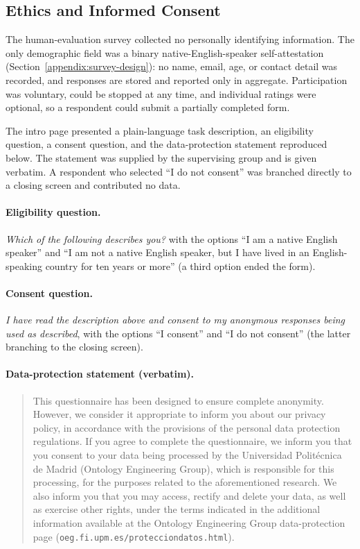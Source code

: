 \subsection{Ethics and Informed Consent}
\label{appendix:ethics}

The human-evaluation survey collected no personally identifying information. The only demographic field was a binary native-English-speaker self-attestation (Section~\ref{appendix:survey-design}): no name, email, age, or contact detail was recorded, and responses are stored and reported only in aggregate. Participation was voluntary, could be stopped at any time, and individual ratings were optional, so a respondent could submit a partially completed form.

The intro page presented a plain-language task description, an eligibility question, a consent question, and the data-protection statement reproduced below. The statement was supplied by the supervising group and is given verbatim. A respondent who selected ``I do not consent'' was branched directly to a closing screen and contributed no data.

\paragraph{Eligibility question.} \textit{Which of the following describes you?} with the options ``I am a native English speaker'' and ``I am not a native English speaker, but I have lived in an English-speaking country for ten years or more'' (a third option ended the form).

\paragraph{Consent question.} \textit{I have read the description above and consent to my anonymous responses being used as described}, with the options ``I consent'' and ``I do not consent'' (the latter branching to the closing screen).

\paragraph{Data-protection statement (verbatim).}
\begin{quote}
This questionnaire has been designed to ensure complete anonymity. However, we consider it appropriate to inform you about our privacy policy, in accordance with the provisions of the personal data protection regulations. If you agree to complete the questionnaire, we inform you that you consent to your data being processed by the Universidad Polit\'ecnica de Madrid (Ontology Engineering Group), which is responsible for this processing, for the purposes related to the aforementioned research. We also inform you that you may access, rectify and delete your data, as well as exercise other rights, under the terms indicated in the additional information available at the Ontology Engineering Group data-protection page (\texttt{oeg.fi.upm.es/protecciondatos.html}).
\end{quote}

